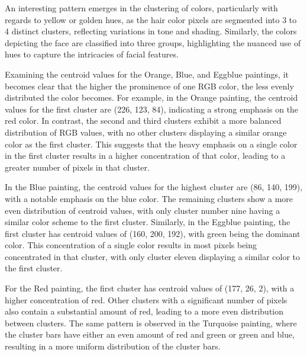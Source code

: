 \documentclass{article}
\begin{document}
An interesting pattern emerges in the clustering of colors, particularly
with regards to yellow or golden hues, as the hair color pixels are
segmented into 3 to 4 distinct clusters, reflecting variations in tone
and shading. Similarly, the colors depicting the face are classified
into three groups, highlighting the nuanced use of hues to capture the
intricacies of facial features.

Examining the centroid values for the Orange, Blue, and Eggblue
paintings, it becomes clear that the higher the prominence of one RGB
color, the less evenly distributed the color becomes. For example, in
the Orange painting, the centroid values for the first cluster are (226,
123, 84), indicating a strong emphasis on the red color. In contrast,
the second and third clusters exhibit a more balanced distribution of
RGB values, with no other clusters displaying a similar orange color as
the first cluster. This suggests that the heavy emphasis on a single
color in the first cluster results in a higher concentration of that
color, leading to a greater number of pixels in that cluster.

In the Blue painting, the centroid values for the highest cluster are
(86, 140, 199), with a notable emphasis on the blue color. The remaining
clusters show a more even distribution of centroid values, with only
cluster number nine having a similar color scheme to the first cluster.
Similarly, in the Eggblue painting, the first cluster has centroid
values of (160, 200, 192), with green being the dominant color. This
concentration of a single color results in most pixels being
concentrated in that cluster, with only cluster eleven displaying a
similar color to the first cluster.

For the Red painting, the first cluster has centroid values of (177, 26,
2), with a higher concentration of red. Other clusters with a
significant number of pixels also contain a substantial amount of red,
leading to a more even distribution between clusters. The same pattern
is observed in the Turquoise painting, where the cluster bars have
either an even amount of red and green or green and blue, resulting in a
more uniform distribution of the cluster bars.
\end{document}

